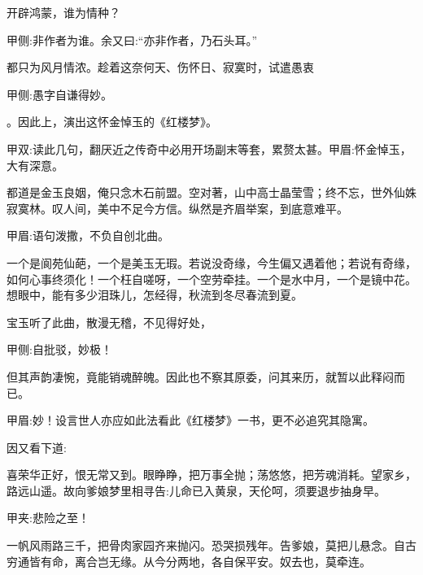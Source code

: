 \begin{qute2sp}
    开辟鸿蒙，谁为情种？\begin{note}甲侧:非作者为谁。余又曰:“亦非作者，乃石头耳。”\end{note}都只为风月情浓。趁着这奈何天、伤怀日、寂寞时，试遣愚衷\begin{note}甲侧:愚字自谦得妙。\end{note}。因此上，演出这怀金悼玉的《红楼梦》。\begin{note}甲双:读此几句，翻厌近之传奇中必用开场副末等套，累赘太甚。甲眉:怀金悼玉，大有深意。\end{note}
\end{qute2sp}


\begin{qute2sp}
    都道是金玉良姻，俺只念木石前盟。空对著，山中高士晶莹雪；终不忘，世外仙姝寂寞林。叹人间，美中不足今方信。纵然是齐眉举案，到底意难平。\begin{note}甲眉:语句泼撒，不负自创北曲。\end{note}
\end{qute2sp}


\begin{qute2sp}
    一个是阆苑仙葩，一个是美玉无瑕。若说没奇缘，今生偏又遇着他；若说有奇缘，如何心事终须化！一个枉自嗟呀，一个空劳牵挂。一个是水中月，一个是镜中花。想眼中，能有多少泪珠儿，怎经得，秋流到冬尽春流到夏。
\end{qute2sp}


\begin{parag}
    宝玉听了此曲，散漫无稽，不见得好处，\begin{note}甲侧:自批驳，妙极！\end{note}但其声韵凄惋，竟能销魂醉魄。因此也不察其原委，问其来历，就暂以此释闷而已。\begin{note}甲眉:妙！设言世人亦应如此法看此《红楼梦》一书，更不必追究其隐寓。\end{note}因又看下道:
\end{parag}


\begin{qute2sp}
    喜荣华正好，恨无常又到。眼睁睁，把万事全抛；荡悠悠，把芳魂消耗。望家乡，路远山遥。故向爹娘梦里相寻告:儿命已入黄泉，天伦呵，须要退步抽身早。\begin{note}甲夹:悲险之至！\end{note}
\end{qute2sp}


\begin{qute2sp}
    一帆风雨路三千，把骨肉家园齐来抛闪。恐哭损残年。告爹娘，莫把儿悬念。自古穷通皆有命，离合岂无缘。从今分两地，各自保平安。奴去也，莫牵连。
\end{qute2sp}


